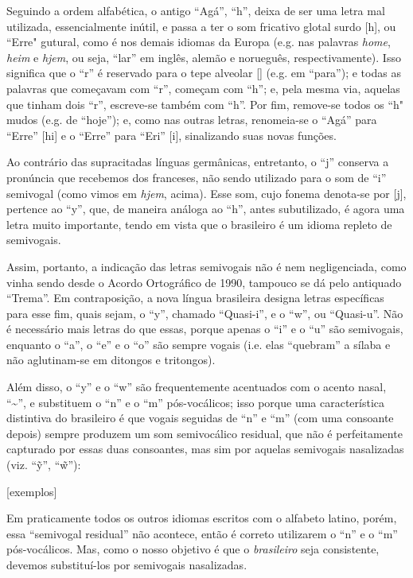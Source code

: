\documentclass[12pt, a5paper, titlepage]{article}
\begin{document}
\begin{bilingualpages}
    Seguindo a ordem alfabética, o antigo ``Agá'', ``h'', deixa de ser uma letra mal utilizada, essencialmente inútil, e passa a ter o som fricativo glotal surdo [h], ou ``Erre" gutural, como é nos demais idiomas da Europa (e.g. nas palavras \textit{home}, \textit{heim} e \textit{hjem}, ou seja, ``lar'' em inglês, alemão e norueguês, respectivamente). Isso significa que o ``r'' é reservado para o tepe alveolar [\textfishhookr] (e.g. em ``para''); e todas as palavras que começavam com ``r'', começam com ``h''; e, pela mesma via, aquelas que tinham dois ``r'', escreve-se também com ``h''. Por fim, remove-se todos os ``h" mudos (e.g. de ``hoje''); e, como nas outras letras, renomeia-se o ``Agá'' para ``Erre'' [\textepsilon hi] e o ``Erre'' para ``Eri'' [\textepsilon \textfishhookr i], sinalizando suas novas funções.

    Ao contrário das supracitadas línguas germânicas, entretanto, o ``j'' conserva a pronúncia que recebemos dos franceses, não sendo utilizado para o som de ``i'' semivogal (como vimos em \textit{hjem}, acima). Esse som, cujo fonema denota-se por [j], pertence ao ``y'', que, de maneira análoga ao ``h'', antes subutilizado, é agora uma letra muito importante, tendo em vista que o brasileiro é um idioma repleto de semivogais.
    
    Assim, portanto, a indicação das letras semivogais não é nem negligenciada, como vinha sendo desde o Acordo Ortográfico de 1990, tampouco se dá pelo antiquado ``Trema''. Em contraposição, a nova língua brasileira designa letras específicas para esse fim, quais sejam, o ``y'', chamado ``Quasi-i'', e o ``w'', ou ``Quasi-u''. Não é necessário mais letras do que essas, porque apenas o ``i'' e o ``u'' são semivogais, enquanto o ``a'', o ``e'' e o ``o'' são sempre vogais (i.e. elas ``quebram'' a sílaba e não aglutinam-se em ditongos e tritongos).
    
    Além disso, o ``y'' e o ``w'' são frequentemente acentuados com o acento nasal, ``\textasciitilde'', e substituem o ``n'' e o ``m'' pós-vocálicos; isso porque uma característica distintiva do brasileiro é que vogais seguidas de ``n'' e ``m'' (com uma consoante depois) sempre produzem um som semivocálico residual, que não é perfeitamente capturado por essas duas consoantes, mas sim por aquelas semivogais nasalizadas (viz. ``\~y'', ``\~w''):

    [exemplos]

    Em praticamente todos os outros idiomas escritos com o alfabeto latino, porém, essa ``semivogal residual'' não acontece, então é correto utilizarem o ``n'' e o ``m'' pós-vocálicos. Mas, como o nosso objetivo é que o \textit{brasileiro} seja consistente, devemos substituí-los por semivogais nasalizadas.


\end{bilingualpages}
\end{document}
